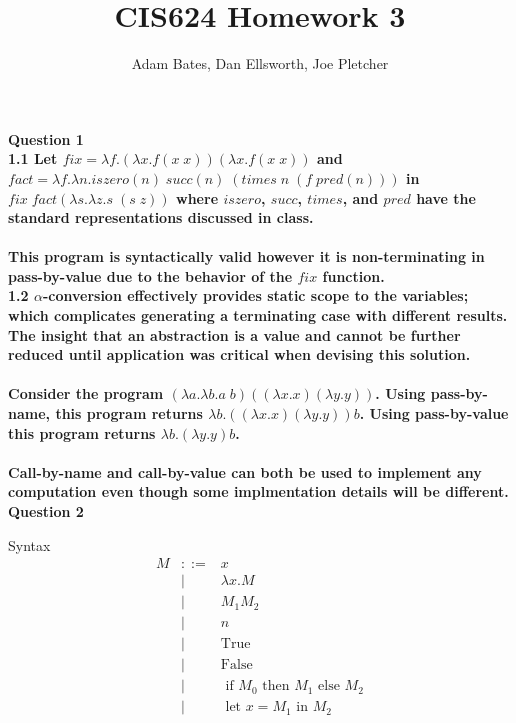 \documentclass[12pt,letterpaper]{article}
\title{CIS624 Homework 3}
\author{Adam Bates, Dan Ellsworth, Joe Pletcher}
\newcommand{\hwSect}[1] {\noindent\large\bf#1\rm\normalsize}
\newcommand{\hwSubSect}[1]{\noindent\large#1\normalsize\newline}
\newcommand{\ifst}[3]{\text{ if } #1 \text{ then } #2 \text{ else } #3}
\newcommand{\lets}[2]{\text{ let }x=#1\text{ in }#2}
\newcommand{\true}{\text{True}}
\newcommand{\false}{\text{False}}
\begin{document}
\maketitle
\noindent

\hwSect{Question 1}\\

\hwSubSect{1.1}
Let $fix=\lambda f.(\lambda x.f (x \; x)) (\lambda x.f (x \; x))$ and $fact=\lambda f.\lambda n. iszero(n) \; succ(n) \; (times \; n \; (f \; pred(n)))$ in $fix \; fact (\lambda s.\lambda z.s \; (s \; z))$ where $iszero$, $succ$, $times$, and $pred$ have the standard representations discussed in class.\\ \\
\noindent
This program is syntactically valid however it is non-terminating in pass-by-value due to the behavior of the $fix$ function.\\

\hwSubSect{1.2}
$\alpha$-conversion effectively provides static scope to the variables; which complicates generating a terminating case with different results. The insight that an abstraction is a value and cannot be further reduced until application was critical when devising this solution.\\ \\
\noindent
Consider the program $(\lambda a.\lambda b.a \; b) ((\lambda x.x) (\lambda y.y))$. Using pass-by-name, this program returns $\lambda b.((\lambda x.x) (\lambda y.y)) b$. Using pass-by-value this program returns $\lambda b.(\lambda y.y) b$.\\ \\
\noindent
Call-by-name and call-by-value can both be used to implement any computation even though some implmentation details will be different.\\ 


\hwSect{Question 2}


Syntax
\begin{eqnarray*}
M & ::= & x \\
&|& \lambda x.M \\
&|& M_1 M_2 \\
&|& n \\
&|& \true \\
&|& \false \\
&|& \ifst{M_0}{M_1}{M_2} \\
&|& \lets{M_1}{M_2} \\
\end{eqnarray*}
\end{document}
